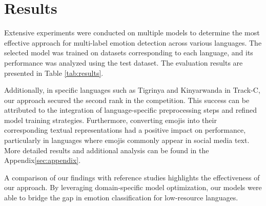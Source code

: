 \section{Results}
Extensive experiments were conducted on multiple models to determine the most effective approach for multi-label emotion detection across various languages. The selected model was trained on datasets corresponding to each language, and its performance was analyzed using the test dataset. The evaluation results are presented in Table \ref{tab:results}.

Additionally, in specific languages such as Tigrinya and Kinyarwanda in Track-C, our approach secured the second rank in the competition. This success can be attributed to the integration of language-specific preprocessing steps and refined model training strategies. Furthermore, converting emojis into their corresponding textual representations had a positive impact on performance, particularly in languages where emojis commonly appear in social media text. More detailed results and additional analysis can be found in the Appendix\ref{sec:appendix}.

A comparison of our findings with reference studies \cite{muhammad2025brighterbridginggaphumanannotated} highlights the effectiveness of our approach. By leveraging domain-specific model optimization, our models were able to bridge the gap in emotion classification for low-resource languages.

